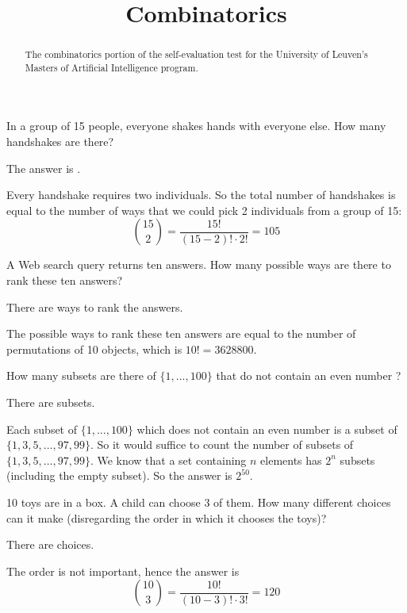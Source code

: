 \documentclass{ximera}
\title{Combinatorics}
\begin{document}
\begin{abstract}
The combinatorics portion of the self-evaluation test for the
University of Leuven's Masters of Artificial Intelligence program.
\end{abstract}
\maketitle



\begin{question}
In a group of 15 people, everyone shakes hands with everyone else.
How many handshakes are there?
\begin{solution}
The answer is .
\end{solution}
Every handshake requires two individuals. So the total number of
handshakes is equal to the number of ways that we could pick 2
individuals from a group of 15:
\[
\binom{15}{2} = \frac{15!}{(15 - 2)! \cdot 2!} = 105
\]
\end{question}

\begin{question}
A Web search query returns ten answers. How many possible ways are
there to rank these ten answers?
\begin{solution}
There are  ways to rank the answers.
\end{solution}
The possible ways to rank these ten answers are equal to the number of
permutations of 10 objects, which is $10! = 3628800$.
\end{question}

\begin{question}
How many subsets are there of $\{1, ... , 100\}$ that do not contain
an even number ?
\begin{solution}
There are  subsets.
\end{solution}
Each subset of $\{1 , \ldots , 100\}$ which does not contain an even
number is a subset of $\{1, 3, 5, \ldots , 97, 99\}$. So it would
suffice to count the number of subsets of $\{1, 3, 5, \ldots , 97,
99\}$. We know that a set containing $n$ elements has $2^n$ subsets
(including the empty subset). So the answer is $2^{50}$.
\end{question}

\begin{question}
10 toys are in a box.  A child can choose 3 of them.  How many
different choices can it make (disregarding the order in which it
chooses the toys)?
\begin{solution}
There are  choices.
\end{solution}
The order is not important, hence the answer is
\[
\binom{10}{3} = \frac{10!}{(10-3)! \cdot 3!} = 120
\]
\end{question}
\end{document}
